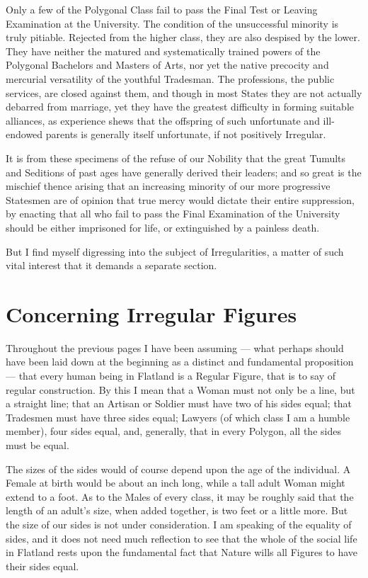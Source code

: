 \documentclass[12pt, a4paper, twoside]{memoir}
\begin{document}
Only a few of the Polygonal Class fail to pass the Final Test or Leaving
Examination at the University. The condition of the unsuccessful minority is
truly pitiable.  Rejected from the higher class, they are also despised by the
lower. They have neither the matured and systematically trained powers of the
Polygonal Bachelors and Masters of Arts, nor yet the native precocity and
mercurial versatility of the youthful Tradesman. The professions, the public
services, are closed against them, and though in most States they are not
actually debarred from marriage, yet they have the greatest difficulty in
forming suitable alliances, as experience shews that the offspring of such
unfortunate and ill-endowed parents is generally itself unfortunate, if not
positively Irregular.

It is from these specimens of the refuse of our Nobility that the great
Tumults and Seditions of past ages have generally derived their leaders; and
so great is the mischief thence arising that an increasing minority of our
more progressive Statesmen are of opinion that true mercy would dictate their
entire suppression, by enacting that all who fail to pass the Final
Examination of the University should be either imprisoned for life, or
extinguished by a painless death.

But I find myself digressing into the subject of Irregularities, a matter of
such vital interest that it demands a separate section.






\chapter{Concerning Irregular Figures}
Throughout the previous pages I have been assuming --- what perhaps should have
been laid down at the beginning as a distinct and fundamental proposition ---
that every human being in Flatland is a Regular Figure, that is to say of
regular construction. By this I mean that a Woman must not only be a line, but
a straight line; that an Artisan or Soldier must have two of his sides equal;
that Tradesmen must have three sides equal; Lawyers (of which class I am a
humble member), four sides equal, and, generally, that in every Polygon, all
the sides must be equal.

The sizes of the sides would of course depend upon the age of the individual.
A Female at birth would be about an inch long, while a tall adult Woman might
extend to a foot. As to the Males of every class, it may be roughly said that
the length of an adult's size, when added together, is two feet or a little
more. But the size of our sides is not under consideration. I am speaking of
the equality of sides, and it does not need much reflection to see that the
whole of the social life in Flatland rests upon the fundamental fact that
Nature wills all Figures to have their sides equal.
\end{document}
